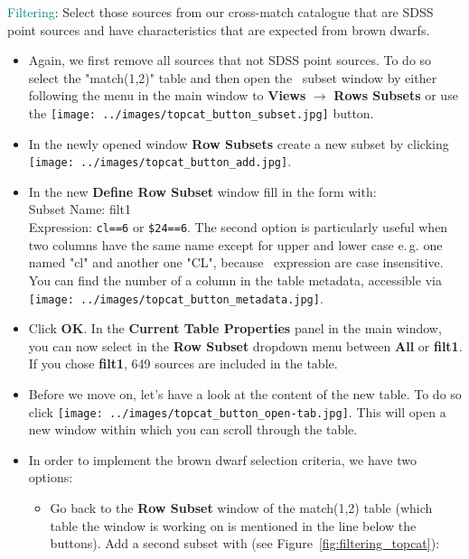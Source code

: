 \documentclass [a4paper, 12pt]{article}
\begin{document}
\noindent \textcolor{teal}{Filtering}: Select those sources from our
cross-match catalogue that are SDSS point sources and have characteristics that
are expected from brown dwarfs.
\begin{itemize}
    \item Again, we first remove all sources that not SDSS point sources. To do
    so select the "match(1,2)" table and then open the \topcat\ subset window
    by either following the menu in the main
    window to \textbf{Views} $\rightarrow$ \textbf{Rows Subsets} or use the
    \texttt{[image: ../images/topcat\_button\_subset.jpg]} button.
    \item In the newly opened window \textbf{Row Subsets} create a new subset
    by clicking \texttt{[image: ../images/topcat\_button\_add.jpg]}.
    \item In the new \textbf{Define Row Subset} window fill in the form with:\\
    Subset Name: filt1\\
    Expression: \texttt{cl==6} or \texttt{\$24==6}. The second option is
    particularly useful when two columns have the same name except for upper
    and lower case e.\,g. one named "cl" and another one "CL", because \topcat\
    expression are case insensitive. You can find the number of a column in the
    table metadata, accessible via \texttt{[image: ../images/topcat\_button\_metadata.jpg]}.
    \item Click \textbf{OK}. In the \textbf{Current Table Properties} panel in
    the main window, you can now select in the \textbf{Row Subset} dropdown
    menu between \textbf{All} or \textbf{filt1}. If you chose \textbf{filt1},
    649 sources are included in the table.
    \item Before we move on, let's have a look at the content of the new table.
    To do so click \texttt{[image: ../images/topcat\_button\_open-tab.jpg]}. This will open a new
    window within
    which you can scroll through the table.
    \item In order to implement the brown dwarf selection criteria, we have two
    options:
    \begin{itemize}
        \item Go back to the \textbf{Row Subset} window of the match(1,2) table
        (which table the window is working on is mentioned in the line below
        the buttons). Add a second subset
        with (see Figure~\ref{fig:filtering_topcat}):\\

\end{itemize}
\end{itemize}
\end{document}
